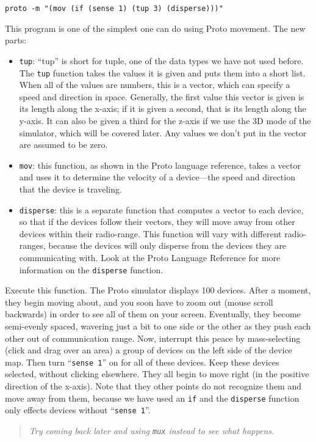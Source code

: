 \documentclass{article}
\newcommand\code[1]{\begin{center}\var{#1}\end{center}}
\newcommand\problem[1]{\begin{quote}{\em #1}\end{quote}}
\newcommand\var[1]{{\tt #1}}
\newcommand\qvar[1]{``{\tt #1}''}
\begin{document}
\code{proto -m "(mov (if (sense 1) (tup 3) (disperse)))"}

This program is one of the simplest one can do using Proto
movement. The new parts:
\begin{itemize}
\item \var{tup}: ``tup'' is short for tuple, one of the data types we
  have not used before.  The \var{tup} function takes the values it is
  given and puts them into a short list.  When all of the values are
  numbers, this is a vector, which can specify a speed and
  direction in space.  Generally, the first value this vector is given
  is its length along the x-axis; if it is given a second, that is its
  length along the y-axis.  It can also be given a third for the
  z-axis if we use the 3D mode of the simulator, which will be covered
  later.  Any values we don't put in the vector are assumed to be
  zero.
\item \var{mov}: this function, as shown in the Proto language
  reference, takes a vector and uses it to determine the velocity of a
  device---the speed and direction that the device is traveling.
\item \var{disperse}: this is a separate function that computes a
  vector to each device, so that if the devices follow their vectors,
  they will move away from other devices within their radio-range.
  This function will vary with different radio-ranges, because the
  devices will only disperse from the devices they are communicating
  with.  Look at the Proto Language Reference for more
  information on the \var{disperse} function.
\end{itemize}

Execute this function.  The Proto simulator displays 100 devices.
After a moment, they begin moving about, and you soon have to zoom out
(mouse scroll backwards) in order to see all of them on your screen.
Eventually, they become semi-evenly spaced, wavering just a bit to one
side or the other as they push each other out of communication range.
Now, interrupt this peace by mass-selecting (click and drag over an
area) a group of devices on the left side of the device map.  Then
turn \qvar{sense 1} on for all of these devices.  Keep these devices
selected, without clicking elsewhere.  They all begin to move right
(in the positive direction of the x-axis).  Note that they other
points do not recognize them and move away from them, because we have
used an \var{if} and the \var{disperse} function only effects devices
without \qvar{sense 1}.  \problem{Try coming back later and using \var{mux}
instead to see what happens.}
\end{document}
